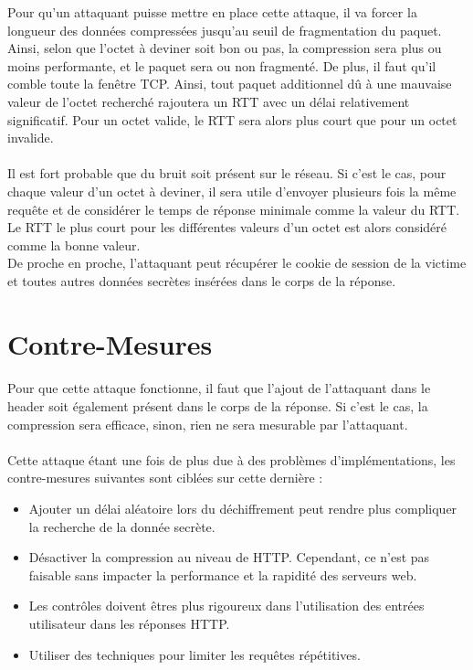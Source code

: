 Pour qu'un attaquant puisse mettre en place cette attaque, il va forcer la longueur des données compressées jusqu'au seuil de fragmentation du paquet. Ainsi, selon que l'octet à deviner soit bon ou pas, la compression sera plus ou moins performante, et le paquet sera ou non fragmenté. De plus, il faut qu'il comble toute la fenêtre TCP. Ainsi, tout paquet additionnel dû à une mauvaise valeur de l'octet recherché rajoutera un RTT avec un délai relativement significatif.
Pour un octet valide, le RTT sera alors plus court que pour un octet invalide.

\paragraph{}
Il est fort probable que du bruit soit présent sur le réseau. Si c'est le cas, pour chaque valeur d'un octet à deviner, il sera utile d'envoyer plusieurs fois la même requête et de considérer le temps de réponse minimale comme la valeur du RTT. Le RTT le plus court pour les différentes valeurs d'un octet est alors considéré comme la bonne valeur.\\

De proche en proche, l'attaquant peut récupérer le cookie de session de la victime et toutes autres données secrètes insérées dans le corps de la réponse.

\section{Contre-Mesures}
\paragraph{}
Pour que cette attaque fonctionne, il faut que l'ajout de l'attaquant dans le header soit également présent dans le corps de la réponse. Si c'est le cas, la compression sera efficace, sinon, rien ne sera mesurable par l'attaquant.

\paragraph{}
Cette attaque étant une fois de plus due à des problèmes d'implémentations, les contre-mesures suivantes sont ciblées sur cette dernière :
\begin{itemize}
  \item Ajouter un délai aléatoire lors du déchiffrement peut rendre plus compliquer la recherche de la donnée secrète.
  \item Désactiver la compression au niveau de HTTP. Cependant, ce n'est pas faisable sans impacter la performance et la rapidité des serveurs web.
  \item Les contrôles doivent êtres plus rigoureux dans l'utilisation des entrées utilisateur dans les réponses HTTP.
  \item Utiliser des techniques pour limiter les requêtes répétitives.
\end{itemize}
